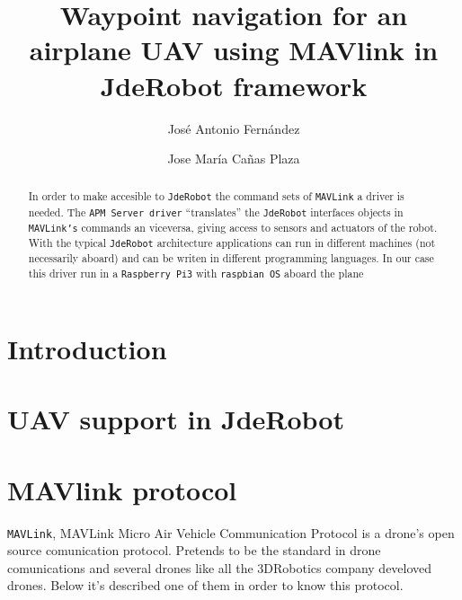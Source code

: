 \documentclass{llncs}
\begin{document}
\title{Waypoint navigation for an airplane UAV using MAVlink in JdeRobot framework}
\author{José Antonio Fernández \and Jose María Cañas Plaza}
\maketitle

\begin{abstract}
In order to make accesible to \texttt{JdeRobot} the command sets of \texttt{MAVLink} a driver is needed. The \texttt{APM Server driver} ``translates'' the \texttt{JdeRobot} interfaces objects in \texttt{MAVLink's} commands an viceversa, giving access to sensors and actuators of the robot. With the typical \texttt{JdeRobot} architecture applications can run in different machines (not necessarily aboard) and can be writen in different programming languages. 
In our case this driver run in a \texttt{Raspberry Pi3} with \texttt{raspbian OS} aboard the plane
\end{abstract}

\section{Introduction}


\section{UAV support in JdeRobot}

\section{MAVlink protocol}

\texttt{MAVLink}, MAVLink Micro Air Vehicle Communication Protocol is a drone's open source comunication protocol. Pretends to be the standard in drone comunications and several drones like all the 3DRobotics company develoved drones.
Below it's described one of them in order to know this protocol.
\end{document}
